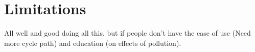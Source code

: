 \documentclass[11pt]{report}
\begin{document}
%




%
%




\chapter{Limitations} \label{limitations}

All well and good doing all this, but if people don't have the ease of use (Need more cycle path) and education (on effects of pollution).
\end{document}
